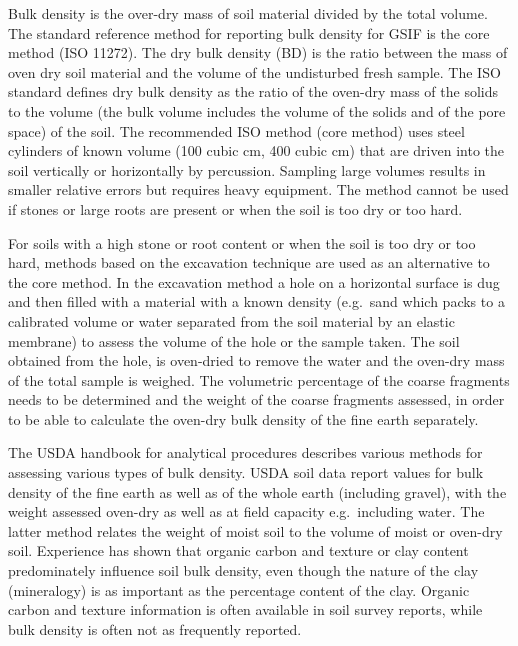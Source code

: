 \documentclass[graybox,natbib,nospthms,UStrade]{svmono}
\begin{document}
Bulk density is the over-dry mass of soil material divided by the total
volume. The standard reference method for reporting bulk density for
GSIF is the core method (ISO 11272). The dry bulk density (BD) is the
ratio between the mass of oven dry soil material and the volume of the
undisturbed fresh sample. The ISO standard defines dry bulk density as
the ratio of the oven-dry mass of the solids to the volume (the bulk
volume includes the volume of the solids and of the pore space) of the
soil. The recommended ISO method (core method) uses steel cylinders of
known volume (100 cubic cm, 400 cubic cm) that are driven into the soil vertically or
horizontally by percussion. Sampling large volumes results in smaller
relative errors but requires heavy equipment. The method cannot be used
if stones or large roots are present or when the soil is too dry or too
hard.

For soils with a high stone or root content or when the soil is too dry
or too hard, methods based on the excavation technique are used as an
alternative to the core method. In the excavation method a hole on a
horizontal surface is dug and then filled with a material with a known
density (e.g.~sand which packs to a calibrated volume or water separated
from the soil material by an elastic membrane) to assess the volume of
the hole or the sample taken. The soil obtained from the hole, is
oven-dried to remove the water and the oven-dry mass of the total sample
is weighed. The volumetric percentage of the coarse fragments needs to
be determined and the weight of the coarse fragments assessed, in order
to be able to calculate the oven-dry bulk density of the fine earth
separately.

The USDA handbook for analytical procedures describes various methods
for assessing various types of bulk density. USDA soil
data report values for bulk density of the fine earth as well as of the
whole earth (including gravel), with the weight assessed oven-dry as
well as at field capacity e.g.~including water. The latter method
relates the weight of moist soil to the volume of moist or oven-dry
soil. Experience has shown that organic carbon and texture or clay
content predominately influence soil bulk density, even though the
nature of the clay (mineralogy) is as important as the percentage
content of the clay. Organic carbon and texture information is often
available in soil survey reports, while bulk density is often not as
frequently reported.
\end{document}

